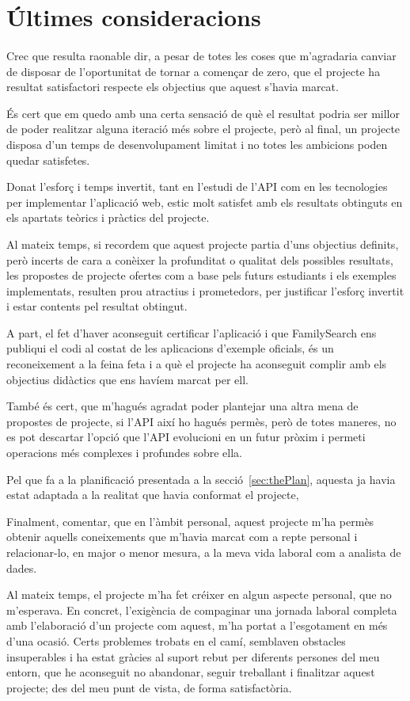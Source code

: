 \section{Últimes consideracions}

    \paragraph{}
    Crec que resulta raonable dir, a pesar de totes les coses que m’agradaria canviar de disposar de l’oportunitat de tornar a començar de zero, que el projecte ha resultat satisfactori respecte els objectius que aquest s’havia marcat.

    És cert que em quedo amb una certa sensació de què el resultat podria ser millor de poder realitzar alguna iteració més sobre el projecte, però al final, un projecte disposa d’un temps de desenvolupament limitat i no totes les ambicions poden quedar satisfetes.

    Donat l’esforç i temps invertit, tant en l’estudi de l’API com en les tecnologies per implementar l’aplicació web, estic molt satisfet amb els resultats obtinguts en els apartats teòrics i pràctics del projecte.

    Al mateix temps, si recordem que aquest projecte partia d’uns objectius definits, però incerts de cara a conèixer la profunditat o qualitat dels possibles resultats, les propostes de projecte ofertes com a base pels futurs estudiants i els exemples implementats, resulten prou atractius i prometedors, per justificar l’esforç invertit i estar contents pel resultat obtingut.

    A part, el fet d'haver aconseguit certificar l'aplicació i que FamilySearch ens publiqui el codi al costat de les aplicacions d'exemple oficials, és un reconeixement a la feina feta i a què el projecte ha aconseguit complir amb els objectius didàctics que ens havíem marcat per ell.

    També és cert, que m’hagués agradat poder plantejar una altra mena de propostes de projecte, si l’API així ho hagués permès, però de totes maneres, no es pot descartar l’opció que l’API evolucioni en un futur pròxim i permeti operacions més complexes  i profundes sobre ella.

    Pel que fa a la planificació presentada a la secció~\ref{sec:thePlan}, aquesta ja havia estat adaptada a la realitat que havia conformat el projecte, 

    Finalment, comentar, que en l’àmbit personal, aquest projecte m’ha permès obtenir aquells coneixements que m’havia marcat com a repte personal i relacionar-lo, en major o menor mesura, a la meva vida laboral com a analista de dades.

    Al mateix temps, el projecte m’ha fet créixer en algun aspecte personal, que no m’esperava. En concret, l’exigència de compaginar una jornada laboral completa amb l’elaboració d’un projecte com aquest, m’ha portat a l’esgotament en més d’una ocasió. Certs problemes trobats en el camí, semblaven obstacles insuperables i ha estat gràcies al suport rebut per diferents persones del meu entorn, que he aconseguit no abandonar, seguir treballant i finalitzar aquest projecte; des del meu punt de vista, de forma satisfactòria.
